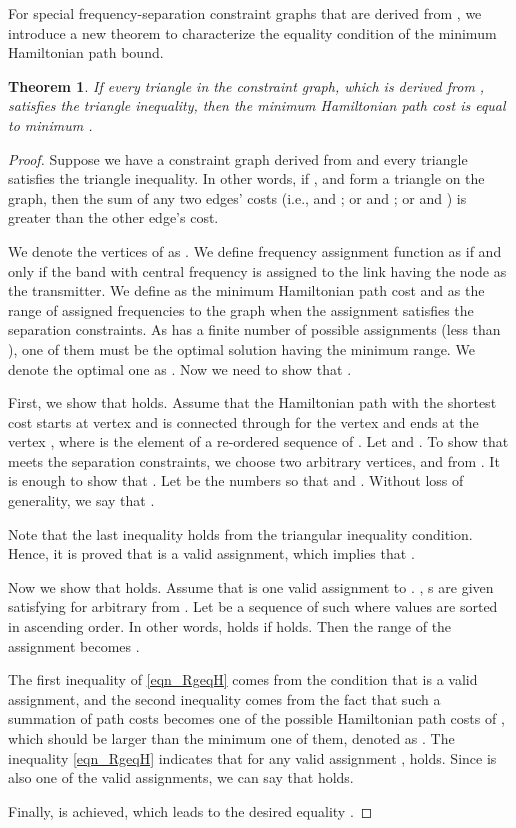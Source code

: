 \documentclass[10pt,twocolumn,twoside]{JCNtran}
\newcommand{\tbirkan}[1]{#1}
\newtheorem{theorem}{Theorem}
\begin{document}
For special frequency-separation constraint graphs that are derived from , we introduce a new theorem  \tbirkan{to characterize the equality condition of the minimum Hamiltonian path bound.} 


\begin{theorem}
If every triangle in the constraint graph, which is derived from , satisfies the triangle inequality, then the  minimum Hamiltonian path cost \tbirkan{is equal to minimum} .
\end{theorem}
\begin{proof}
Suppose we have a constraint graph  derived from  and every triangle satisfies the triangle inequality. In other words, if , and   form a triangle on the graph, then the sum of any two edges' costs (i.e.,  and ; or  and ; or  and ) is greater than the other edge's cost. 

We denote the vertices of  as . We define frequency assignment function  as  if and only if the band with central frequency  is assigned to the link having the node  as the transmitter. We define  as the minimum Hamiltonian path cost and  as the range of assigned frequencies to the graph  when the assignment  satisfies the separation constraints. As  has a finite number of possible assignments (less than ), one of them must be the optimal solution having the minimum range. We denote the optimal one as . Now we need to show that .

First, we show that  holds. Assume that the Hamiltonian path with the shortest cost starts at vertex  and is connected through  for the  vertex and ends at the vertex , where  is the  element of a re-ordered sequence of . Let  and . To show that  meets the separation constraints, we choose two arbitrary  vertices,  and  from . It is enough to show that . Let  be the numbers so that  and . Without loss of generality, we say that .

Note that the last inequality holds from the triangular inequality condition. Hence, it is proved that  is a valid assignment, which implies that . 


Now we show that  holds. Assume that  is one valid assignment to . , s are given satisfying  for arbitrary  from . Let  be a sequence of  such where  values are sorted in ascending order. In other words,  holds if  holds. Then the range of the assignment becomes .

The first inequality of \eqref{eqn_RgeqH} comes from the condition that  is a valid assignment, and the second inequality comes from the fact that such a summation of  path costs becomes one of the possible Hamiltonian path costs of , which should be larger than the minimum one of them, denoted as . The inequality \eqref{eqn_RgeqH} indicates that for any valid assignment ,  holds. Since  is also one of the valid assignments, we can say that  holds.

Finally,  is achieved, which leads to the desired equality .


\end{proof}
\end{document}
